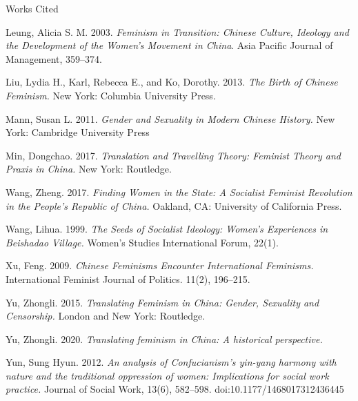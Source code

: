 \documentclass[12pt]{article}
\newcommand{\bibent}{\noindent \hangindent 40pt}
\newenvironment{workscited}{\newpage \begin{center} Works Cited \end{center}}{\newpage }
\begin{document}
\begin{flushleft}
\begin{workscited}
			\bibent
			Leung, Alicia S. M. 2003. \textit{Feminism in Transition: Chinese Culture, Ideology and the Development of the Women’s Movement in China}. Asia Pacific Journal of Management, 359–374.
			
			\bibent
			Liu, Lydia H., Karl, Rebecca E., and Ko, Dorothy. 2013. \textit{The Birth of Chinese Feminism.} New York: Columbia University Press.
			
			\bibent
			Mann, Susan L. 2011. \textit{Gender and Sexuality in Modern Chinese History.} New York: Cambridge University Press
			
			\bibent
			Min, Dongchao. 2017. \textit{Translation and Travelling Theory: Feminist Theory and Praxis in China.} New York: Routledge.
			
			\bibent Wang, Zheng. 2017. \textit{Finding Women in the State: A Socialist Feminist Revolution in the People’s Republic of China.} Oakland, CA: University of California Press.
			
			\bibent
			Wang, Lihua. 1999. \textit{The Seeds of Socialist Ideology: Women’s Experiences in Beishadao Village.} Women’s Studies International Forum, 22(1).
			
			\bibent Xu, Feng. 2009. \textit{Chinese Feminisms Encounter International Feminisms. } International Feminist Journal of Politics. 11(2), 196–215.
			
			\bibent
			Yu, Zhongli. 2015. \textit{Translating Feminism in China: Gender, Sexuality and Censorship.} London and New York: Routledge.
			
			\bibent
			Yu, Zhongli. 2020. \textit{Translating feminism in China: A historical perspective.} 
			
			\bibent
			Yun, Sung Hyun. 2012. \textit{An analysis of Confucianism’s yin-yang harmony with nature and the traditional oppression of women: Implications for social work practice.} Journal of Social Work, 13(6), 582–598. doi:10.1177/1468017312436445 
			
			
		\end{workscited}
		
	\end{flushleft}
\end{document}
